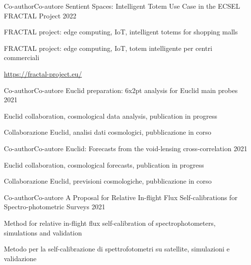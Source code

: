 


\begin{cventries}


\cventry
{\ifenglish Co-author\else Co-autore\fi} %
{Sentient Spaces: Intelligent Totem Use Case in the ECSEL FRACTAL Project} %
{2022} %
{ %
\begin{cvitems}
  \ifenglish
  \item {FRACTAL project: edge computing, IoT, intelligent totems for shopping malls}
  \else
  \item {FRACTAL project: edge computing, IoT, totem intelligente per centri commerciali}
  \fi
  \item {\url{https://fractal-project.eu/}}
\end{cvitems}
}
\cventry
{\ifenglish Co-author\else Co-autore\fi} %
{Euclid preparation: 6x2pt analysis for Euclid main probes} %
{2021} %
{ %
\begin{cvitems}
  \ifenglish
  \item {Euclid collaboration, cosmological data analysis, publication in progress}
  \else
  \item {Collaborazione Euclid, analisi dati cosmologici, pubblicazione in corso}
  \fi
\end{cvitems}
}
\cventry
{\ifenglish Co-author\else Co-autore\fi} %
{Euclid: Forecasts from the void-lensing cross-correlation} %
{2021} %
{ %
\begin{cvitems}
  \ifenglish
  \item {Euclid collaboration, cosmological forecasts, publication in progress}
  \else
  \item {Collaborazione Euclid, previsioni cosmologiche, pubblicazione in corso}
  \fi
\end{cvitems}
}
\cventry
{\ifenglish Co-author\else Co-autore\fi} %
{A Proposal for Relative In-flight Flux Self-calibrations for Spectro-photometric Surveys} %
{2021} %
{ %
\begin{cvitems}
  \ifenglish
  \item {Method for relative in-flight flux self-calibration of spectrophotometers, simulations and validation}
  \else
  \item {Metodo per la self-calibrazione di spettrofotometri su satellite, simulazioni e validazione}
  \fi
\end{cvitems}
}

\end{cventries}